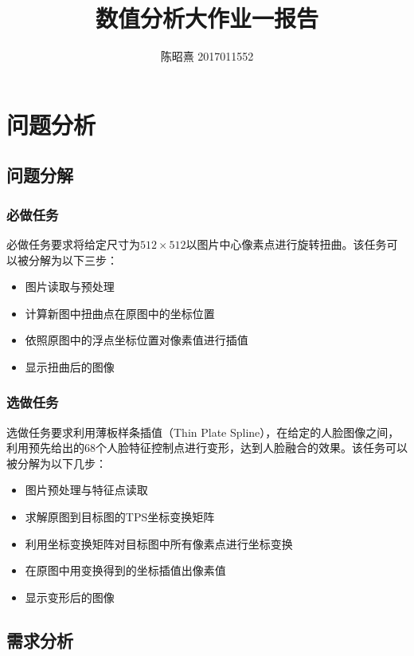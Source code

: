 \documentclass[UTF8]{ctexart}
\begin{document}
\title{数值分析大作业一报告}
\author{陈昭熹 2017011552}
\maketitle

\section{问题分析}

\subsection{问题分解}

\subsubsection{必做任务}

必做任务要求将给定尺寸为$512 \times 512$以图片中心像素点进行旋转扭曲。该任务可以被分解为以下三步：
\begin{itemize}
    \item 图片读取与预处理
    \item 计算新图中扭曲点在原图中的坐标位置
    \item 依照原图中的浮点坐标位置对像素值进行插值
    \item 显示扭曲后的图像
\end{itemize}

\subsubsection{选做任务}
选做任务要求利用薄板样条插值（Thin Plate Spline），在给定的人脸图像之间，利用预先给出的68个人脸特征控制点进行变形，达到人脸融合的效果。该任务可以被分解为以下几步：
\begin{itemize}
\item 图片预处理与特征点读取
\item 求解原图到目标图的TPS坐标变换矩阵
\item 利用坐标变换矩阵对目标图中所有像素点进行坐标变换
\item 在原图中用变换得到的坐标插值出像素值
\item 显示变形后的图像
\end{itemize}

\subsection{需求分析}
\end{document}
